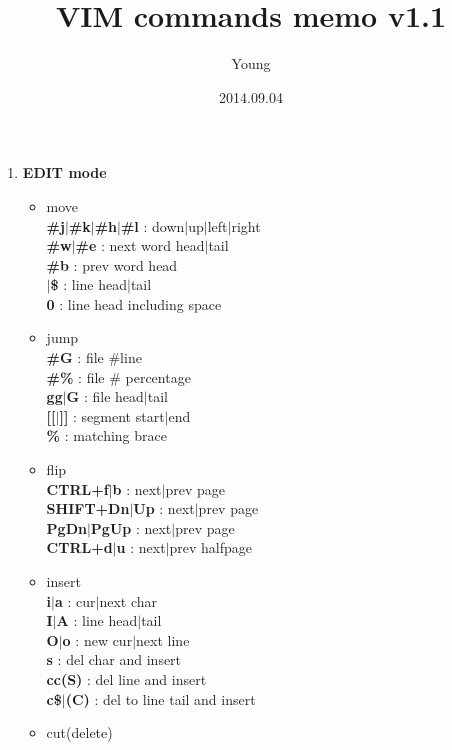\documentclass[10pt, a4paper]{article}
\begin{document}
\twocolumn

\pagestyle{empty}
\title{VIM commands memo v1.1}
\author{Young}
\date{2014.09.04}
\maketitle
\thispagestyle{empty} %

\setlength{\baselineskip}{12pt} %

\begin{enumerate}
\item{\textbf{EDIT mode}}
	\begin{itemize}
	\item move \\
	\textbf{\#j{$|$}\#k{$|$}\#h{$|$}\#l} : down{$|$}up{$|$}left{$|$}right \\
	\textbf{\#w{$|$}\#e} : next word head{$|$}tail \\
	\textbf{\#b} : prev word head \\ 
	\textbf{\^{$|$}\$} : line head{$|$}tail \\ 
	\textbf{0} : line head including space
	\item jump \\
	\textbf{\#G} : file \#line \\
	\textbf{\#\%} : file \# percentage \\ 
	\textbf{gg{$|$}G} : file head{$|$}tail \\ 
	\textbf{[[{$|$}]]} : segment start{$|$}end \\
	\textbf{\%} : matching brace
	\item flip \\
	\textbf{CTRL+f{$|$}b} : next{$|$}prev page \\
	\textbf{SHIFT+Dn{$|$}Up} : next{$|$}prev page \\
	\textbf{PgDn{$|$}PgUp} : next{$|$}prev page \\
	\textbf{CTRL+d{$|$}u} : next{$|$}prev halfpage
	\item insert \\
	\textbf{i{$|$}a} : cur{$|$}next char \\
	\textbf{I{$|$}A} : line head{$|$}tail \\
	\textbf{O{$|$}o} : new cur{$|$}next line \\ 
	\textbf{s} : del char and insert \\ 
	\textbf{cc(S)} : del line and insert \\
	\textbf{c\${$|$}(C)} : del to line tail and insert
	\item cut(delete) \\

\end{itemize}
\end{enumerate}
\end{document}
